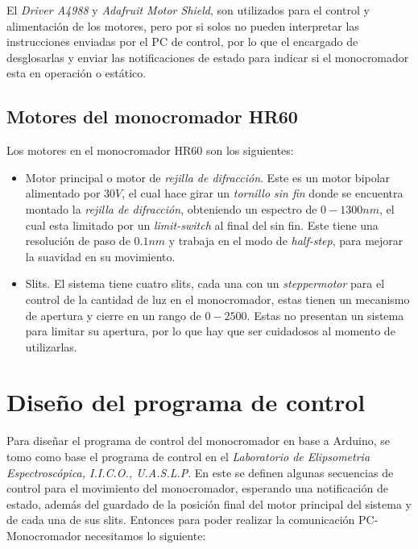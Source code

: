 El \textit{Driver A4988} y \textit{Adafruit Motor Shield}, son utilizados para el control y alimentación de los motores, pero por si solos no pueden interpretar las instrucciones enviadas por el PC de control, por lo que el encargado de desglosarlas y enviar las notificaciones de estado para indicar si el monocromador esta en operación o estático.

\subsection{Motores del monocromador HR60}
\label{sec:ch2-motors}

Los motores en el monocromador HR60 son los siguientes:
\begin{itemize}
    \item Motor principal o motor de \textit{rejilla de difracción}. Este es un motor bipolar alimentado por $30 V$, el cual hace girar un \textit{tornillo sin fin} donde se encuentra montado la \textit{rejilla de difracción}, obteniendo un espectro de $0-1300nm$, el cual esta limitado por un \textit{limit-switch} al final del sin fin. Este tiene una resolución de paso de $0.1nm$ y trabaja en el modo de \textit{half-step}, para mejorar la suavidad en su movimiento.
    \item Slits. El sistema tiene cuatro slits, cada una con un \textit{steppermotor} para el control de la  cantidad de luz en el monocromador, estas tienen un mecanismo de apertura y cierre en un rango de $0-2500$. Estas no presentan un sistema para limitar su apertura, por lo que hay que ser cuidadosos al momento de utilizarlas.
\end{itemize}

\section{Diseño del programa de control}
\label{sec:ch2-control}
Para diseñar el programa de control del monocromador en base a Arduino, se tomo como base el programa de control en el \textit{Laboratorio de Elipsometria Espectroscópica, I.I.C.O., U.A.S.L.P}. En este se definen algunas secuencias de control para el movimiento del monocromador, esperando una notificación de estado, además del guardado de la posición final del motor principal del sistema y de cada una de sus slits. Entonces para poder realizar la comunicación PC-Monocromador necesitamos lo siguiente:

